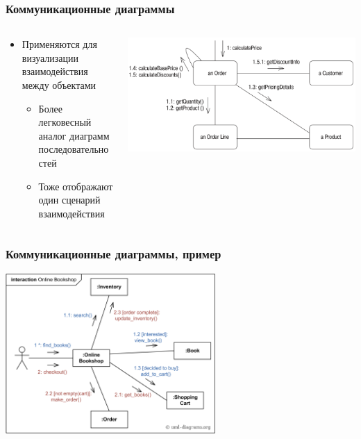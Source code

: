 \documentclass{../mcsslides}
\begin{document}
    \begin{frame}
        \frametitle{Коммуникационные диаграммы}
        \begin{columns}
            \begin{column}{0.5\textwidth}
                \begin{itemize}
                    \item Применяются для визуализации взаимодействия между объектами
                    \begin{itemize}
                        \item Более легковесный аналог диаграмм последовательностей
                        \item Тоже отображают один сценарий взаимодействия
                    \end{itemize}
                \end{itemize}
            \end{column}
            \begin{column}{0.5\textwidth}
                \begin{center}
                    \includegraphics[width=\textwidth]{communicationDiagram.png}
                \end{center}
            \end{column}
        \end{columns}
    \end{frame}

    \begin{frame}
        \frametitle{Коммуникационные диаграммы, пример}
        \begin{center}
            \includegraphics[width=0.6\textwidth]{communicationDiagramExample.png}
        \end{center}
    \end{frame}
\end{document}
